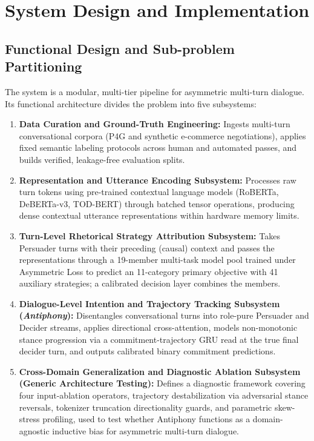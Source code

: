 \chapter{System Design and Implementation}
\label{ch:design}

\section{Functional Design and Sub-problem Partitioning}
\label{sec:architecture}

The system is a modular, multi-tier pipeline for asymmetric multi-turn dialogue. Its functional architecture divides the problem into five subsystems:
\begin{enumerate}
  \item \textbf{Data Curation and Ground-Truth Engineering:} Ingests multi-turn conversational corpora (P4G and synthetic e-commerce negotiations), applies fixed semantic labeling protocols across human and automated passes, and builds verified, leakage-free evaluation splits.
  \item \textbf{Representation and Utterance Encoding Subsystem:} Processes raw turn tokens using pre-trained contextual language models (RoBERTa, DeBERTa-v3, TOD-BERT) through batched tensor operations, producing dense contextual utterance representations within hardware memory limits.
  \item \textbf{Turn-Level Rhetorical Strategy Attribution Subsystem:} Takes Persuader turns with their preceding (causal) context and passes the representations through a 19-member multi-task model pool trained under Asymmetric Loss to predict an 11-category primary objective with 41 auxiliary strategies; a calibrated decision layer combines the members.
  \item \textbf{Dialogue-Level Intention and Trajectory Tracking Subsystem (\textit{Antiphony}):} Disentangles conversational turns into role-pure Persuader and Decider streams, applies directional cross-attention, models non-monotonic stance progression via a commitment-trajectory GRU read at the true final decider turn, and outputs calibrated binary commitment predictions.
  \item \textbf{Cross-Domain Generalization and Diagnostic Ablation Subsystem (Generic Architecture Testing):} Defines a diagnostic framework covering four input-ablation operators, trajectory destabilization via adversarial stance reversals, tokenizer truncation directionality guards, and parametric skew-stress profiling, used to test whether Antiphony functions as a domain-agnostic inductive bias for asymmetric multi-turn dialogue.
\end{enumerate}

